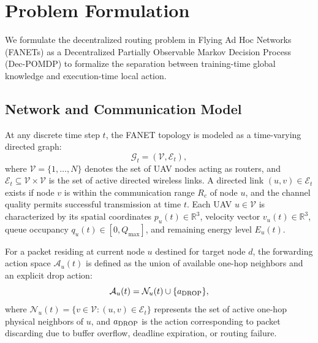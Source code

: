 \section{Problem Formulation}
\label{sec:problem}

We formulate the decentralized routing problem in Flying Ad Hoc Networks (FANETs) as a Decentralized Partially Observable Markov Decision Process (Dec-POMDP) to formalize the separation between training-time global knowledge and execution-time local action.

\subsection{Network and Communication Model}
At any discrete time step $t$, the FANET topology is modeled as a time-varying directed graph:
\begin{equation}
    \mathcal{G}_t = (\mathcal{V}, \mathcal{E}_t),
\end{equation}
where $\mathcal{V}=\{1,\ldots,N\}$ denotes the set of UAV nodes acting as routers, and $\mathcal{E}_t \subseteq \mathcal{V} \times \mathcal{V}$ is the set of active directed wireless links. A directed link $(u, v) \in \mathcal{E}_t$ exists if node $v$ is within the communication range $R_c$ of node $u$, and the channel quality permits successful transmission at time $t$. Each UAV $u \in \mathcal{V}$ is characterized by its spatial coordinates $p_u(t) \in \mathbb{R}^3$, velocity vector $v_u(t) \in \mathbb{R}^3$, queue occupancy $q_u(t) \in [0, Q_{\max}]$, and remaining energy level $E_u(t)$. 

For a packet residing at current node $u$ destined for target node $d$, the forwarding action space $\mathcal{A}_u(t)$ is defined as the union of available one-hop neighbors and an explicit drop action:
\begin{equation}
    \mathcal{A}_u(t) = \mathcal{N}_u(t) \cup \{a_{\mathrm{DROP}}\},
\end{equation}
where $\mathcal{N}_u(t) = \{v \in \mathcal{V} : (u, v) \in \mathcal{E}_t\}$ represents the set of active one-hop physical neighbors of $u$, and $a_{\mathrm{DROP}}$ is the action corresponding to packet discarding due to buffer overflow, deadline expiration, or routing failure.

